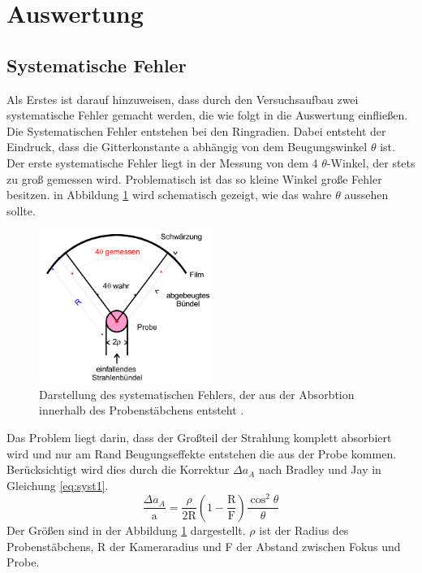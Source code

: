 ﻿\section{Auswertung}
\label{sec:Auswertung}
\subsection{Systematische Fehler}
Als Erstes ist darauf hinzuweisen, dass durch den Versuchsaufbau zwei systematische Fehler gemacht werden, die wie folgt in die Auswertung einfließen.
Die Systematischen Fehler entstehen bei den Ringradien. 
Dabei entsteht der Eindruck, dass die Gitterkonstante a abhängig von dem Beugungswinkel $\theta$ ist. \\
Der erste systematische Fehler liegt in der Messung von dem 4 $\theta$-Winkel, der stets zu groß gemessen wird. 
Problematisch ist das so kleine Winkel große Fehler besitzen. 
in Abbildung \ref{fig:sys1} wird schematisch gezeigt, wie das wahre $\theta$ aussehen sollte.
\begin{figure}
\centering
	\includegraphics[width = 0.5\textwidth]{Abbildungen/Syst1.png}
	\caption{Darstellung des systematischen Fehlers, der aus der Absorbtion innerhalb des Probenstäbchens entsteht \cite{Anleitung}.}
	\label{fig:sys1}
\end{figure} 
Das Problem liegt darin, dass der Großteil der Strahlung komplett absorbiert wird und nur am Rand Beugungseffekte entstehen die aus der Probe kommen.
Berücksichtigt wird dies durch die Korrektur $\Delta a_A$ nach Bradley und Jay in Gleichung \ref{eq:syst1}.
\begin{equation}
\frac{\Delta a_A}{\text{a}} = \frac{\rho}{2\text{R}}\left( 1-\frac{\text{R}}{\text{F}} \right)\frac{\cos^2{\theta}}{\theta}
\label{eq:syst1}
\end{equation}
Der Größen sind in der Abbildung \ref{fig:sys1} dargestellt. 
$\rho$ ist der Radius des Probenstäbchens, R der Kameraradius und F der Abstand zwischen Fokus und Probe.
